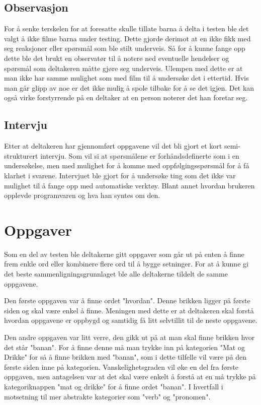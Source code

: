  
\subsection{Observasjon} 
 
For å senke terskelen for at foresatte skulle tillate barna å delta i testen ble det valgt å ikke filme barna under testing. Dette gjorde derimot at en ikke fikk med seg reaksjoner eller spørsmål som ble stilt underveis. Så for å kunne fange opp dette ble det brukt en observatør til å notere ned eventuelle hendelser og spørsmål som deltakeren måtte gjøre seg underveis. Ulempen med dette er at man ikke har samme mulighet som med film til å undersøke det i ettertid. Hvis man går glipp av noe er det ikke mulig å spole tilbake for å se det igjen. Det kan også virke forstyrrende på en deltaker at en person noterer det han foretar seg. 

 
\subsection{Intervju} 

Etter at deltakeren har gjennomført oppgavene vil det bli gjort et kort semi-strukturert intervju. Som vil si at spørsmålene er forhåndsdefinerte som i en undersøkelse, men med mulighet for å komme med oppfølgingsspørsmål for å få klarhet i svarene. Intervjuet ble gjort for å undersøke ting som det ikke var mulighet til å fange opp med automatiske verktøy. Blant annet hvordan brukeren opplevde programvaren og hva han syntes om den. 
 
\section{Oppgaver} 

Som en del av testen ble deltakerne gitt oppgaver som går ut på enten å finne frem enkle ord eller kombinere flere ord til å bygge setninger. For at å kunne gi det beste sammenligningsgrunnlaget ble alle deltakerne tildelt de samme oppgavene. 
 
 
Den første oppgaven var å finne ordet "hvordan". Denne brikken ligger på første siden og skal være enkel å finne. Meningen med dette er at deltakeren skal forstå hvordan oppgavene er oppbygd og samtidig få litt selvtillit til de neste oppgavene. 
 
 
Den andre oppgaven var litt verre, den gikk ut på at man skal finne brikken hvor det står "banan". For å finne denne må man trykke inn på kategorien "Mat og Drikke" for så å finne brikken med "banan", som i dette tilfelle vil være på den første siden inne på kategorien. Vanskelighetsgraden vil øke en del fra første oppgaven, men antagelsen var at det skal være enkelt å forstå at en må trykke på kategoriknappen "mat og drikke" for å finne ordet "banan". I hvertfall i motsetning til mer abstrakte kategorier som "verb" og "pronomen". 
 
